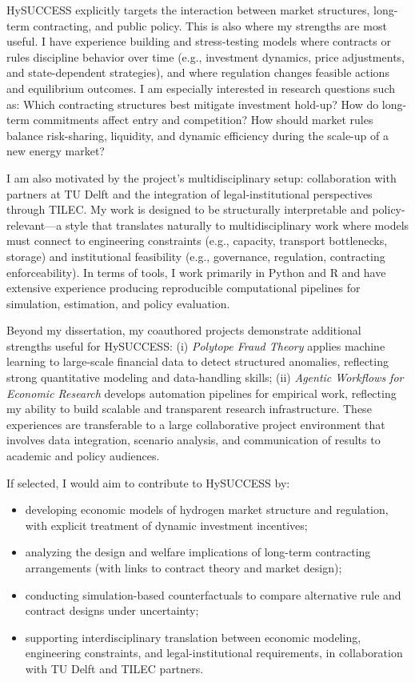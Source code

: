 \documentclass[11pt]{article}
\begin{document}
HySUCCESS explicitly targets the interaction between market structures, long-term contracting, and public policy. This is also where my strengths are most useful. I have experience building and stress-testing models where contracts or rules discipline behavior over time (e.g., investment dynamics, price adjustments, and state-dependent strategies), and where regulation changes feasible actions and equilibrium outcomes. I am especially interested in research questions such as: Which contracting structures best mitigate investment hold-up? How do long-term commitments affect entry and competition? How should market rules balance risk-sharing, liquidity, and dynamic efficiency during the scale-up of a new energy market?

I am also motivated by the project’s multidisciplinary setup: collaboration with partners at TU Delft and the integration of legal-institutional perspectives through TILEC. My work is designed to be structurally interpretable and policy-relevant---a style that translates naturally to multidisciplinary work where models must connect to engineering constraints (e.g., capacity, transport bottlenecks, storage) and institutional feasibility (e.g., governance, regulation, contracting enforceability). In terms of tools, I work primarily in Python and R and have extensive experience producing reproducible computational pipelines for simulation, estimation, and policy evaluation.

Beyond my dissertation, my coauthored projects demonstrate additional strengths useful for HySUCCESS: (i) \emph{Polytope Fraud Theory} applies machine learning to large-scale financial data to detect structured anomalies, reflecting strong quantitative modeling and data-handling skills; (ii) \emph{Agentic Workflows for Economic Research} develops automation pipelines for empirical work, reflecting my ability to build scalable and transparent research infrastructure. These experiences are transferable to a large collaborative project environment that involves data integration, scenario analysis, and communication of results to academic and policy audiences.

If selected, I would aim to contribute to HySUCCESS by:
\begin{itemize}
  \item developing economic models of hydrogen market structure and regulation, with explicit treatment of dynamic investment incentives;
  \item analyzing the design and welfare implications of long-term contracting arrangements (with links to contract theory and market design);
  \item conducting simulation-based counterfactuals to compare alternative rule and contract designs under uncertainty;
  \item supporting interdisciplinary translation between economic modeling, engineering constraints, and legal-institutional requirements, in collaboration with TU Delft and TILEC partners.
\end{itemize}
\end{document}
